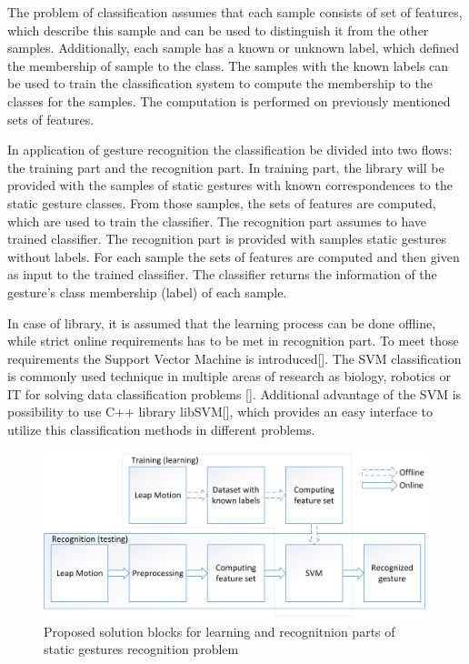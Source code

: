 
The problem of classification assumes that each sample consists of set of features, which describe this sample and can be used to distinguish it from the other samples.
Additionally, each sample has a known or unknown label, which defined the membership of sample to the class. 
The samples with the known labels can be used to train the classification system to compute the membership to the classes for the samples. 
The computation is performed on previously mentioned sets of features.

In application of gesture recognition the classification be divided into two flows: the training part and the recognition part. 
In training part, the library will be provided with the samples of static gestures with known correspondences to the static gesture classes. 
From those samples, the sets of features are computed, which are used to train the classifier.
The recognition part assumes to have trained classifier. 
The recognition part is provided with samples static gestures without labels. 
For each sample the sets of features are computed and then given as input to the trained classifier.
The classifier returns the information of the gesture's class membership (label) of each sample.

In case of library, it is assumed that the learning process can be done offline, while strict online requirements has to be met in recognition part. 
To meet those requirements the Support Vector Machine is introduced[]. 
The SVM classification is commonly used technique in multiple areas of research as biology, robotics or IT for solving data classification problems [].
Additional advantage of the SVM is possibility to use C++ library libSVM[], which provides an easy interface to utilize this classification methods in different problems.

\begin{figure}[htb]
\centering
 \includegraphics[width=1\columnwidth]{figures/StaticGestures.png}
 \caption[]{Proposed solution blocks for learning and recognitnion parts of static gestures recognition problem}
 \label{svmmargin}
\end{figure}


